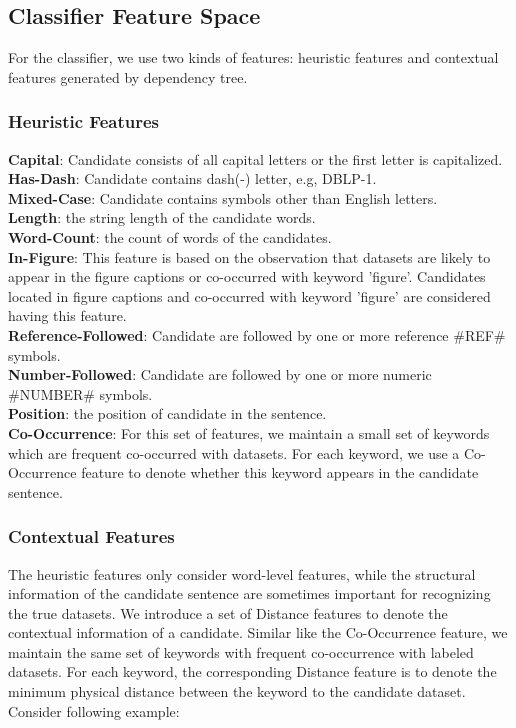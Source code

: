 \documentclass[11pt]{article}
\begin{document}
\subsection{Classifier Feature Space}
For the classifier, we use two kinds of features: heuristic features and contextual features generated by dependency tree. 

\subsubsection{Heuristic Features}

\noindent \textbf{Capital}: Candidate consists of all capital letters or the first letter is capitalized. \\
\noindent \textbf{Has-Dash}: Candidate contains dash(-) letter, e.g, DBLP-1. \\
\noindent \textbf{Mixed-Case}: Candidate contains symbols other than English letters. \\
\noindent \textbf{Length}: the string length of the candidate words. \\
\noindent \textbf{Word-Count}: the count of words of the candidates. \\
\noindent \textbf{In-Figure}: This feature is based on the observation that datasets are likely to appear in the figure captions or co-occurred with keyword 'figure'. Candidates located in figure captions and co-occurred with keyword 'figure' are considered having this feature. \\
\noindent \textbf{Reference-Followed}: Candidate are followed by one or more reference \#REF\# symbols. \\
\noindent \textbf{Number-Followed}: Candidate are followed by one or more numeric \#NUMBER\# symbols. \\
\noindent \textbf{Position}: the position of candidate in the sentence. \\
\noindent \textbf{Co-Occurrence}: For this set of features, we maintain a small set of keywords which are frequent co-occurred with datasets. For each keyword, we use a Co-Occurrence feature to denote whether this keyword appears in the candidate sentence. \\

\subsubsection{Contextual Features}
The heuristic features only consider word-level features, while the structural information of the candidate sentence are sometimes important for recognizing the true datasets. We introduce a set of Distance features to denote the contextual information of a candidate. Similar like the Co-Occurrence feature, we maintain the same set of keywords with frequent co-occurrence with labeled datasets. For each keyword, the corresponding Distance feature is to denote the minimum physical distance between the keyword to the candidate dataset. Consider following example: \\
\end{document}
